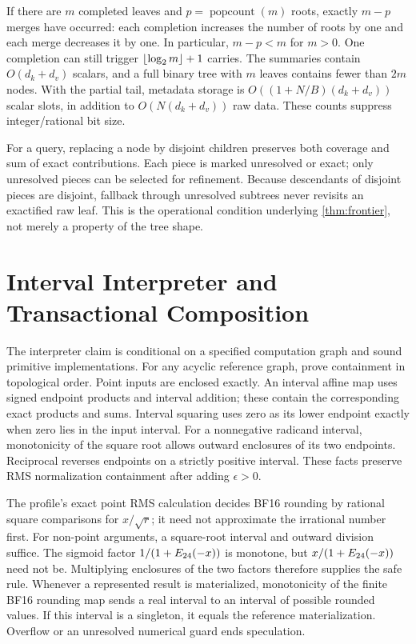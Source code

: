 If there are $m$ completed leaves and $p=\operatorname{popcount}(m)$
roots, exactly $m-p$ merges have occurred: each completion increases the
number of roots by one and each merge decreases it by one. In particular,
$m-p<m$ for $m>0$. One completion can still trigger
$\left\lfloor\log_2m\right\rfloor+1$ carries. The summaries contain $O(d_k+d_v)$
scalars, and a full binary tree with $m$ leaves contains fewer than $2m$
nodes. With the partial tail, metadata storage is
$O((1+N/B)(d_k+d_v))$ scalar slots, in addition to
$O(N(d_k+d_v))$ raw data. These counts suppress integer/rational bit size.

For a query, replacing a node by disjoint children preserves both coverage
and sum of exact contributions. Each piece is marked unresolved or exact;
only unresolved pieces can be selected for refinement. Because descendants
of disjoint pieces are disjoint, fallback through unresolved subtrees never
revisits an exactified raw leaf. This is the operational condition underlying
\cref{thm:frontier}, not merely a property of the tree shape.

\section{Interval Interpreter and Transactional Composition}
\label{app:interpreter}

The interpreter claim is conditional on a specified computation graph and
sound primitive implementations. For any acyclic reference graph, prove
containment in topological order. Point inputs are enclosed exactly. An
interval affine map uses signed endpoint products and interval addition;
these contain the corresponding exact products and sums. Interval squaring
uses zero as its lower endpoint exactly when zero lies in the input interval.
For a nonnegative radicand interval, monotonicity of the square root allows
outward enclosures of its two endpoints. Reciprocal reverses endpoints on
a strictly positive interval. These facts preserve RMS normalization
containment after adding $\epsilon>0$.

The profile's exact point RMS calculation decides BF16 rounding by rational
square comparisons for $x/\sqrt r$; it need not approximate the irrational
number first. For non-point arguments, a square-root interval and outward
division suffice. The sigmoid factor $1/(1+E_{24}(-x))$ is monotone, but
$x/(1+E_{24}(-x))$ need not be. Multiplying enclosures of the two factors
therefore supplies the safe rule. Whenever a represented result is
materialized, monotonicity of the finite BF16 rounding map sends a real
interval to an interval of possible rounded values. If this interval is a
singleton, it equals the reference materialization. Overflow or an
unresolved numerical guard ends speculation.

